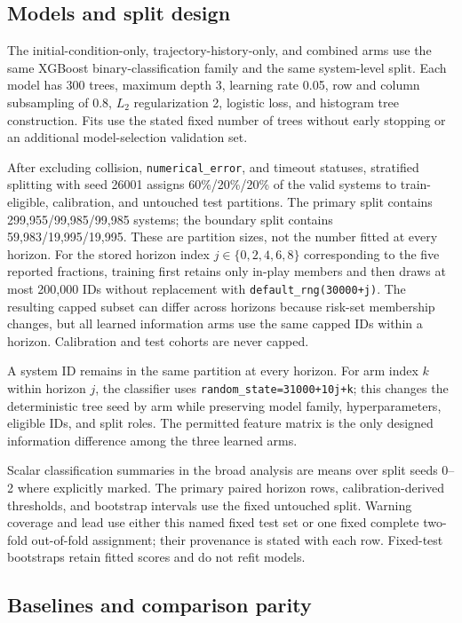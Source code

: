 \documentclass[linenumbers,twocolumn]{aastex702}
\begin{document}
\subsection{Models and split design}\label{sec:models}

The initial-condition-only, trajectory-history-only, and combined arms use the same XGBoost binary-classification family \citep{ChenGuestrin2016} and the same system-level split. Each model has 300 trees, maximum depth 3, learning rate 0.05, row and column subsampling of 0.8, $L_2$ regularization 2, logistic loss, and histogram tree construction. Fits use the stated fixed number of trees without early stopping or an additional model-selection validation set.

After excluding collision, \texttt{numerical\_error}, and timeout statuses, stratified splitting with seed 26001 assigns 60\%/20\%/20\% of the valid systems to train-eligible, calibration, and untouched test partitions. The primary split contains 299,955/99,985/99,985 systems; the boundary split contains 59,983/19,995/19,995. These are partition sizes, not the number fitted at every horizon. For the stored horizon index $j\in\{0,2,4,6,8\}$ corresponding to the five reported fractions, training first retains only in-play members and then draws at most 200,000 IDs without replacement with \texttt{default\_rng(30000+j)}. The resulting capped subset can differ across horizons because risk-set membership changes, but all learned information arms use the same capped IDs within a horizon. Calibration and test cohorts are never capped.

A system ID remains in the same partition at every horizon. For arm index $k$ within horizon $j$, the classifier uses \texttt{random\_state=31000+10j+k}; this changes the deterministic tree seed by arm while preserving model family, hyperparameters, eligible IDs, and split roles. The permitted feature matrix is the only designed information difference among the three learned arms.

Scalar classification summaries in the broad analysis are means over split seeds 0--2 where explicitly marked. The primary paired horizon rows, calibration-derived thresholds, and bootstrap intervals use the fixed untouched split. Warning coverage and lead use either this named fixed test set or one fixed complete two-fold out-of-fold assignment; their provenance is stated with each row. Fixed-test bootstraps retain fitted scores and do not refit models.

\subsection{Baselines and comparison parity}\label{sec:baselines}
\end{document}
